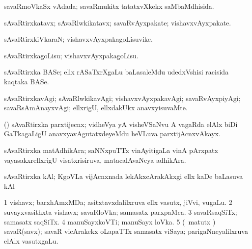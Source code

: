 {{\bentry
{} 
\gl{\gu}
\expl{}
\bmng
savaRmoVkaSx vAdada; savaRmukitx tatatxvXkekx saMbaMdhisida. 
\emng
\eentry

\bentry
{} 
\gl{\nA}
\expl{}
\bmng
sAvaRtirxkatavx; sAvaRlwkikatavx; savaRvAyxpakate; vishavxvAyxpakate. 
\emng
\eentry

\bentry
{} 
\gl{\nA}
\expl{}
\bmng
sAvaRtirxkiVkaraN; vishavxvAyxpakagoLisuvike. 
\emng
\eentry

\bentry
{} 
\gl{\sakirx}
\expl{}
\bmng
sAvaRtirxkagoLisu; vishavxvAyxpakagoLisu. 
\emng
\eentry

\bentry
{}
\gl{\nA}
\expl{}
\bmng
{} 
\emng
\eentry

\bentry
{}
\gl{\nA}
\expl{}
\bmng
sAvaRtirxka BASe; ellx rASaTxrXgaLu baLasaleMdu udedxVshisi racisida kaqtaka BASe. 
\emng
\eentry

\bentry
{} 
\gl{\kirxvi}
\expl{}
\bmng
sAvaRtirxkavAgi; sAvaRlwkikavAgi; vishavxvAyxpakavAgi; savaRvAyxpiyAgi; savaRsAmAnayxvAgi; ellxrigU, ellxdakUkx anavxyisuvaMte. 
\emng
\eentry

\bentry
{}
\gl{\nA}
\expl{}
\bmng
(\takaR) sAvaRtirxka parxtijecnx; vidheVya yA visheVSaNvu A vagaRda elAlx biDi GaTkagaLigU anavxyavAgutatxdeyeMdu heVLuva parxtijAcnxvAkayx. 
\emng
\eentry

\bentry
{}
\gl{\nA}
\expl{}
\bmng
sAvaRtirxka matAdhikAra; saNNxpuTTx vinAyitigaLa vinA pArxpatx vayasakxrellxrigU visatxrisiruva, matacalAvaNeya adhikAra. 
\emng
\eentry

\bentry
{}
\gl{\nA}
\expl{}
\bmng
sAvaRtirxka kAl; KgoVLa vijAcnxnada lekAkxcArakAkxgi ellx kaDe baLasuva kAl  
\emng
\eentry

\bentry
{} 
\gl{\nA}
\expl{}
\bmng
\bnum
\num{1} vishavx; barxhAmxMDa; asitxtavxdalilxruva ellx vasutx, jiVvi, \mo vugaLu. 
\num{2} suvayxvasithxta vishavx; savaRloVka; samasatx parxpaMca. 
\num{3} savaRsaqSiTx; samasatx saqSiTx. 
\num{4} manuSayxkoVTi; manuSayx loVka. 
\num{5} (\saMshA\ matutx \takaR) savaR(savx); savaR vicArakekx oLapaTTx samasatx viSaya; parigaNneyalilxruva elAlx vasutxgaLu. 
\enum
\emng

}}
